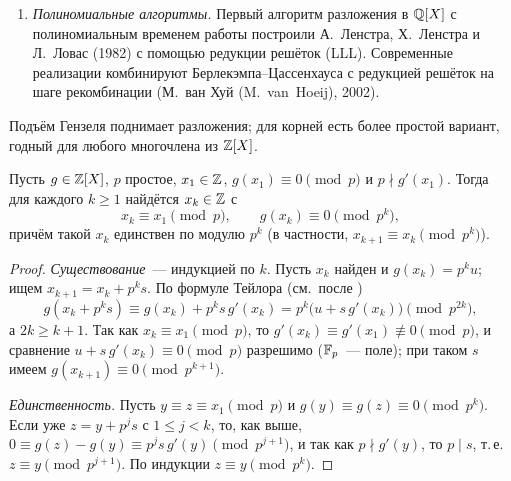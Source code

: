 \begin{aside}
\begin{enumerate}[leftmargin=*,label=\arabic*.]
\begin{itemize}[leftmargin=*]
единственности подъёма , применённой к разложениям $f=G\cdot(f/G)$ и
$f\equiv\prod_{i\in S}g_i\cdot\prod_{i\notin S}g_i$, получаем $G\equiv\prod_{i\in S}g_i\pmod{p^k}$). Перебираем подмножества по возрастанию размера и проверяем делимость в $\Z[X]$.
\end{itemize}
Все шаги, кроме последнего, выполняются за полиномиальное время; рекомбинация в худшем случае требует перебора $2^r$
подмножеств. Худший случай дают \emph{многочлены Суиннертона-Дайера}~--- минимальные многочлены сумм
$\sqrt{p_1}+\dots+\sqrt{p_n}$ для различных простых $p_i$ (при $n=2$, $p_1=2$, $p_2=3$ это $X^4-10X^2+1$). Их степень
равна $2^n$, а по модулю каждого простого они распадаются на множители степени не выше $2$, т.\,е.\ не менее чем на
$2^{n-1}$ множителей.

\item \emph{Полиномиальные алгоритмы.} Первый алгоритм разложения в $\mathbb Q[X]$ с полиномиальным временем работы построили
А.~Ленстра, Х.~Ленстра и Л.~Ловас (1982) с помощью редукции решёток (LLL). Современные реализации комбинируют
Берлекэмпа--Цассенхауса с редукцией решёток на шаге рекомбинации (М.~ван Хуй (M.~van~Hoeij), 2002).
\end{enumerate}
\end{aside}

Подъём Гензеля  поднимает разложения; для корней есть более простой вариант, годный для любого многочлена из
$\Z[X]$.

\begin{lemma}
Пусть $g\in\mathbb Z[X]$, $p$ простое, $x_1\in\mathbb Z$, $g(x_1)\equiv0\pmod p$ и $p\nmid g'(x_1)$. Тогда для каждого $k\ge1$ найдётся
$x_k\in\mathbb Z$ с
\[
x_k\equiv x_1\pmod p,\qquad g(x_k)\equiv0\pmod{p^k},
\]
причём такой $x_k$ единствен по модулю $p^k$ (в частности, $x_{k+1}\equiv x_k\pmod{p^k}$).
\end{lemma}

\begin{proof}
\emph{Существование}~--- индукцией по $k$. Пусть $x_k$ найден и $g(x_k)=p^ku$; ищем $x_{k+1}=x_k+p^ks$. По формуле Тейлора
(см.\ после )
\[
g(x_k+p^ks)\equiv g(x_k)+p^ks\,g'(x_k)=p^k\bigl(u+s\,g'(x_k)\bigr)\pmod{p^{2k}},
\]
а $2k\ge k+1$. Так как $x_k\equiv x_1\pmod p$, то $g'(x_k)\equiv g'(x_1)\not\equiv0\pmod p$, и сравнение
$u+s\,g'(x_k)\equiv0\pmod p$ разрешимо ($\mathbb F_p$~--- поле); при таком $s$ имеем $g(x_{k+1})\equiv0\pmod{p^{k+1}}$.

\emph{Единственность.} Пусть $y\equiv z\equiv x_1\pmod p$ и $g(y)\equiv g(z)\equiv0\pmod{p^k}$. Если уже $z=y+p^js$ с
$1\le j<k$, то, как выше, $0\equiv g(z)-g(y)\equiv p^js\,g'(y)\pmod{p^{j+1}}$, и так как $p\nmid g'(y)$, то $p\mid s$, т.\,е.\
$z\equiv y\pmod{p^{j+1}}$. По индукции $z\equiv y\pmod{p^k}$.
\end{proof}

